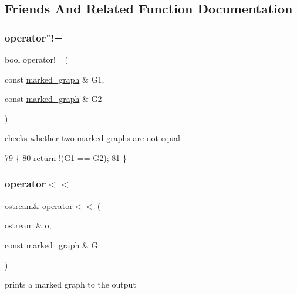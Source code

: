 \subsection{Friends And Related Function Documentation}
\mbox{\label{classmarked__graph_a52ab641f19231908b18f8661bad17493}} 
\subsubsection{\texorpdfstring{operator"!=}{operator!=}}
{\footnotesize\ttfamily bool operator!= (\begin{DoxyParamCaption}\item[{const \hyperlink{classmarked__graph}{marked\+\_\+graph} \&}]{G1,  }\item[{const \hyperlink{classmarked__graph}{marked\+\_\+graph} \&}]{G2 }\end{DoxyParamCaption})\hspace{0.3cm}{\ttfamily [friend]}}



checks whether two marked graphs are not equal 


\begin{DoxyCode}
79 \{
80   \textcolor{keywordflow}{return} !(G1 == G2);
81 \}
\end{DoxyCode}
\mbox{\label{classmarked__graph_a4f98d2df29f50f6da1365a14fd80d764}} 
\subsubsection{\texorpdfstring{operator$<$$<$}{operator<<}}
{\footnotesize\ttfamily ostream\& operator$<$$<$ (\begin{DoxyParamCaption}\item[{ostream \&}]{o,  }\item[{const \hyperlink{classmarked__graph}{marked\+\_\+graph} \&}]{G }\end{DoxyParamCaption})\hspace{0.3cm}{\ttfamily [friend]}}



prints a marked graph to the output 


